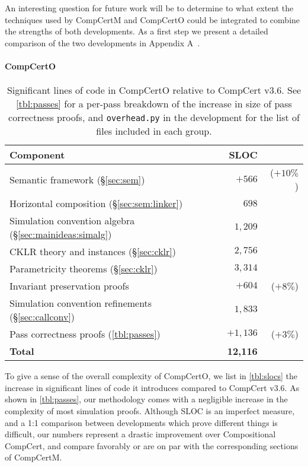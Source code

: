 \documentclass[sigplan,screen,review]{acmart}
\newcommand{\figsize}{\small}
\begin{document}
An interesting question for future work will be to determine
to what extent the techniques used by CompCertM and CompCertO could be
integrated to combine the strengths of both developments.  As a first
step we present a detailed comparison of the two developments
in Appendix A~\cite{compcerto21tr}.


\paragraph{CompCertO} %

\begin{table} %
  \caption{Significant lines of code in CompCertO
    relative to CompCert v$3.6$.
    See \autoref{tbl:passes}
    for a per-pass breakdown of the increase in size
    of pass correctness proofs,
    and \texttt{overhead.py} in the development
    for the list of files included in each group.}
  \label{tbl:slocs}
  \setlength\tabcolsep{3pt}
  \begin{tabular}{lrr}
    \toprule
    Component & SLOC & \\ %
    \midrule
    Semantic framework (\S\ref{sec:sem}) & $+566$ & ($+10\%$) \\
    Horizontal composition (\S\ref{sec:sem:linker}) & $698$ & \\
    Simulation convention algebra (\S\ref{sec:mainideas:simalg}) & $1{,}209$ & \\
    CKLR theory and instances (\S\ref{sec:cklr}) & $2{,}756$ & \\
    Parametricity theorems (\S\ref{sec:cklr}) & $3{,}314$ & \\
    Invariant preservation proofs & $+604$ & ($+8\%$) \\
    Simulation convention refinements (\S\ref{sec:callconv}) & $1{,}833$ \\
    Pass correctness proofs (\autoref{tbl:passes}) & $+1{,}136$ & ($+3\%$) \\
    \midrule
    \textbf{Total} & \textbf{12{,}116} & \\
    \bottomrule
  \end{tabular}
\end{table}

To give a sense of the overall complexity of CompCertO,
we list in \autoref{tbl:slocs}
the increase in significant lines of code it introduces
compared to CompCert v$3.6$.
As shown in \autoref{tbl:passes},
our methodology comes with a negligible increase
in the complexity of most simulation proofs.
Although SLOC is an imperfect measure,
and a 1:1 comparison between developments which
prove different things is difficult,
our numbers represent
a drastic improvement over Compositional CompCert,
and compare favorably
or are on par with
the corresponding sections of CompCertM.
\end{document}
